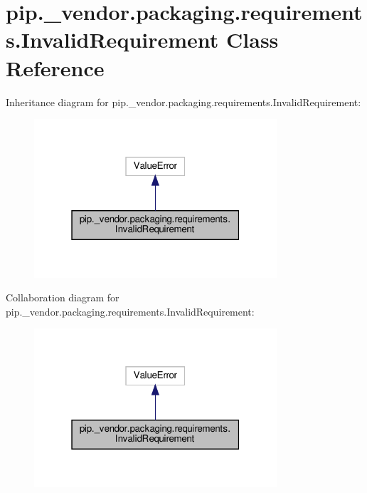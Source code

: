\hypertarget{classpip_1_1__vendor_1_1packaging_1_1requirements_1_1InvalidRequirement}{}\section{pip.\+\_\+vendor.\+packaging.\+requirements.\+Invalid\+Requirement Class Reference}
\label{classpip_1_1__vendor_1_1packaging_1_1requirements_1_1InvalidRequirement}


Inheritance diagram for pip.\+\_\+vendor.\+packaging.\+requirements.\+Invalid\+Requirement\+:
\nopagebreak
\begin{figure}[H]
\begin{center}
\leavevmode
\includegraphics[width=256pt]{classpip_1_1__vendor_1_1packaging_1_1requirements_1_1InvalidRequirement__inherit__graph}
\end{center}
\end{figure}


Collaboration diagram for pip.\+\_\+vendor.\+packaging.\+requirements.\+Invalid\+Requirement\+:
\nopagebreak
\begin{figure}[H]
\begin{center}
\leavevmode
\includegraphics[width=256pt]{classpip_1_1__vendor_1_1packaging_1_1requirements_1_1InvalidRequirement__coll__graph}
\end{center}
\end{figure}


